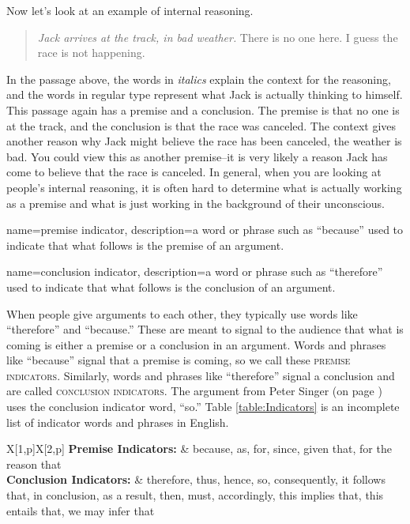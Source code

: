 Now let's look at an example of internal reasoning. 

\begin{quotation}\noindent\textit{Jack arrives at the track, in bad weather.} There is no one here. I guess the race is not happening. \label{racetrack}
\end{quotation}

In the passage above, the words in \textit{italics} explain the context for the reasoning, and the words in regular type represent what Jack is actually thinking to himself.  This passage again has a premise and a conclusion. The premise is that no one is at the track, and the conclusion is that the race was canceled. The context gives another reason why Jack might believe the race has been canceled, the weather is bad. You could view this as another premise--it is very likely a reason Jack has come to believe that the race is canceled. In general, when you are looking at people's internal reasoning, it is often hard to determine what is actually working as a premise and what is just working in the background of their unconscious. %


{
name=premise indicator,
description={a word or phrase such as ``because'' used to indicate that what follows is the premise of an argument.}
}

{
name=conclusion indicator,
description={a word or phrase such as ``therefore'' used to indicate that what follows is the conclusion of an argument.}
}

When people give arguments to each other, they typically use words like ``therefore'' and ``because.'' These are meant to signal to the audience that what is coming is either a premise or a conclusion in an argument. Words and phrases like ``because'' signal that a premise is coming, so we call these \textsc{\glspl{premise indicator}}. Similarly, words and phrases like ``therefore'' signal a conclusion and are called \textsc{\glspl{conclusion indicator}}. The argument from Peter Singer (on page \pageref{singer_quote}) uses the conclusion indicator word, ``so.'' Table \ref{table:Indicators} is an incomplete list of indicator words and phrases in English.


\begin{table}
\begin{mdframed}[style=mytablebox]

\begin{longtabu}{X[1,p]X[2,p]}
\textbf{Premise Indicators:} & because, as, for, since, given that, for the reason that \\
\textbf{Conclusion Indicators:} & therefore, thus, hence, so, consequently, it follows that, in conclusion, as a result, then, must, accordingly, this implies that, this entails that, we may infer that \\
\end{longtabu}
\end{mdframed}
\caption{Premise and Conclusion Indicators.}
\label{table:Indicators}
\end{table}

